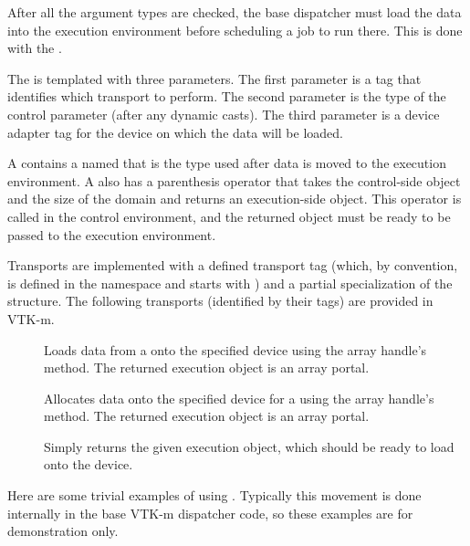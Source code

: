
After all the argument types are checked, the base dispatcher must load the
data into the execution environment before scheduling a job to run
there. This is done with the  .

The   is templated with three
parameters. The first parameter is a tag that identifies which transport to
perform. The second parameter is the type of the control parameter (after any
dynamic casts). The third parameter is a device adapter tag for the device
on which the data will be loaded.

A  contains a  named
 that is the type used after data is moved to the
execution environment. A  also has a
 parenthesis operator that takes the control-side object
and the size of the domain and returns an execution-side object. This
operator is called in the control environment, and the returned object must
be ready to be passed to the execution environment.

Transports are implemented with a defined transport tag (which, by
convention, is defined in the \vtkmcontarg{} namespace and starts with
) and a partial specialization of the
 structure. The following transports (identified by
their tags) are provided in VTK-m.

\begin{description}
\item[] 
  Loads data from a  onto the specified device using
  the array handle's  method. The returned
  execution object is an array portal.
\item[] 
  Allocates data onto the specified device for a 
  using the array handle's  method. The returned
  execution object is an array portal.
\item[]
   Simply returns the given execution
  object, which should be ready to load onto the device.
\end{description}

Here are some trivial examples of using
. Typically this movement is done internally in
the base VTK-m dispatcher code, so these examples are for demonstration
only.

